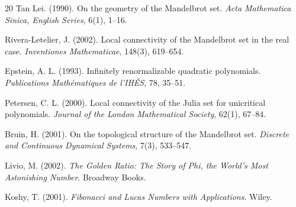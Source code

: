 \documentclass[12pt]{article}
\begin{document}
\begin{thebibliography}{20}
Tan Lei. (1990). On the geometry of the Mandelbrot set. \textit{Acta Mathematica Sinica, English Series}, 6(1), 1--16.

Rivera-Letelier, J. (2002). Local connectivity of the Mandelbrot set in the real case. \textit{Inventiones Mathematicae}, 148(3), 619--654.

Epstein, A. L. (1993). Infinitely renormalizable quadratic polynomials. \textit{Publications Mathématiques de l'IHÉS}, 78, 35--51.

Petersen, C. L. (2000). Local connectivity of the Julia set for unicritical polynomials. \textit{Journal of the London Mathematical Society}, 62(1), 67--84.

Bruin, H. (2001). On the topological structure of the Mandelbrot set. \textit{Discrete and Continuous Dynamical Systems}, 7(3), 533--547.

Livio, M. (2002). \textit{The Golden Ratio: The Story of Phi, the World's Most Astonishing Number}. Broadway Books.

Koshy, T. (2001). \textit{Fibonacci and Lucas Numbers with Applications}. Wiley.

\end{thebibliography}
\end{document}
